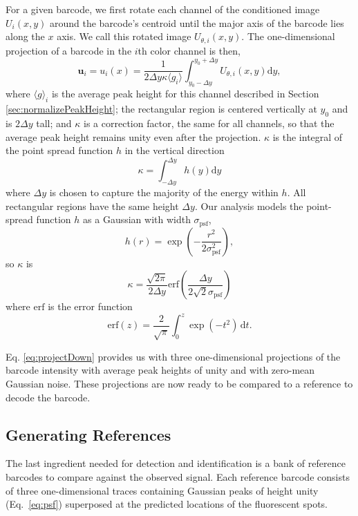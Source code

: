   For a given barcode, we first rotate each channel of the  conditioned image $U_i(x,y)$ around the barcode's centroid until the major axis of the barcode lies along the $x$ axis. We call this rotated image  $U_{\theta,i}(x,y)$. The one-dimensional projection of a barcode in the $i$th color channel is then, 
\begin{equation}\label{eq:projectDown}
	   \mathbf{u}_i=u_i(x)=\frac{1}{2 \Delta y \kappa\langle g_i \rangle}  \int_{y_0 - \Delta y}^{y_0+\Delta y} { {U_{\theta,i}(x,y) \mathrm{d}y} },
\end{equation}
where $\langle g \rangle_i$ is the average peak height for this channel described in Section \ref{sec:normalizePeakHeight}; the rectangular region is centered vertically at $y_0$ and is $2\Delta y$ tall; and $\kappa$ is a correction factor, the same for all channels, so that the average peak height remains unity even after the projection. $\kappa$ is the integral of the point spread function $h$ in the vertical direction
\begin{equation}
	\kappa=\int_{-\Delta y}^{\Delta y} h(y) \mathrm{d}y
\end{equation}
where $\Delta y$ is chosen to capture the majority of the energy within $h$. All rectangular regions have the same height $\Delta y$. Our analysis models the point-spread function $h$ as a Gaussian with width $\sigma_{\text{psf}}$,
\begin{equation}\label{eq:psf}
h(r)=\exp \left(  -\frac{r^2}{2\sigma_{\text{psf}}^2} \right),
\end{equation}
so $\kappa$ is
\begin{equation}
\kappa = \frac{\sqrt{2\pi}} {2 \Delta y} \text{erf} \left(\frac{\Delta y}{2\sqrt{2}\sigma_{\text{psf}}} \right)
\end{equation}
where $\text{erf}$ is the error function \citep{reif_fundamentals_1965}
\begin{equation}
\text{erf}(z) = \frac{2}{\sqrt{\pi}} \int_0^z \exp (-t^2) \, \mathrm{d}t.
\end{equation}

Eq. \ref{eq:projectDown} provides us with three one-dimensional projections of the barcode intensity with average peak heights of unity and with zero-mean Gaussian noise. These projections are now ready to be compared to a reference to decode the barcode.

\subsection{Generating References}\label{sec:generateReferences}
The last ingredient needed for detection and identification is a bank of reference barcodes to compare against the observed signal. Each reference barcode consists of three one-dimensional traces containing  Gaussian peaks of height unity (Eq.~\ref{eq:psf}) superposed at the predicted locations of the fluorescent spots. 


